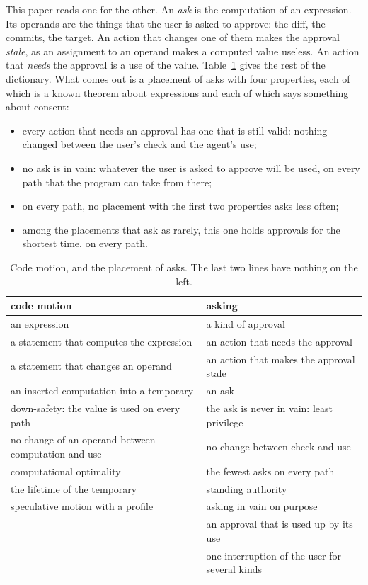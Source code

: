 \documentclass[acmsmall,nonacm,screen]{acmart}
\begin{document}
This paper reads one for the other. An \emph{ask} is the computation of an expression. Its
operands are the things that the user is asked to approve: the diff, the commits, the
target. An action that changes one of them makes the approval \emph{stale}, as an assignment
to an operand makes a computed value useless. An action that \emph{needs} the approval is a
use of the value. Table~\ref{tab:dictionary} gives the rest of the dictionary. What comes out
is a placement of asks with four properties, each of which is a known theorem about
expressions and each of which says something about consent:
\begin{itemize}
\item every action that needs an approval has one that is still valid: nothing changed
  between the user's check and the agent's use;
\item no ask is in vain: whatever the user is asked to approve will be used, on every path
  that the program can take from there;
\item on every path, no placement with the first two properties asks less often;
\item among the placements that ask as rarely, this one holds approvals for the shortest
  time, on every path.
\end{itemize}

\begin{table}
\caption{Code motion, and the placement of asks. The last two lines have nothing on the
left.}
\label{tab:dictionary}
\small
\begin{tabular}{ll}
\toprule
code motion & asking \\
\midrule
an expression & a kind of approval \\
a statement that computes the expression & an action that needs the approval \\
a statement that changes an operand & an action that makes the approval stale \\
an inserted computation into a temporary & an ask \\
down-safety: the value is used on every path & the ask is never in vain: least privilege \\
no change of an operand between computation and use & no change between check and use \\
computational optimality & the fewest asks on every path \\
the lifetime of the temporary & standing authority \\
speculative motion with a profile & asking in vain on purpose \\
& an approval that is used up by its use \\
& one interruption of the user for several kinds \\
\bottomrule
\end{tabular}
\end{table}
\end{document}
